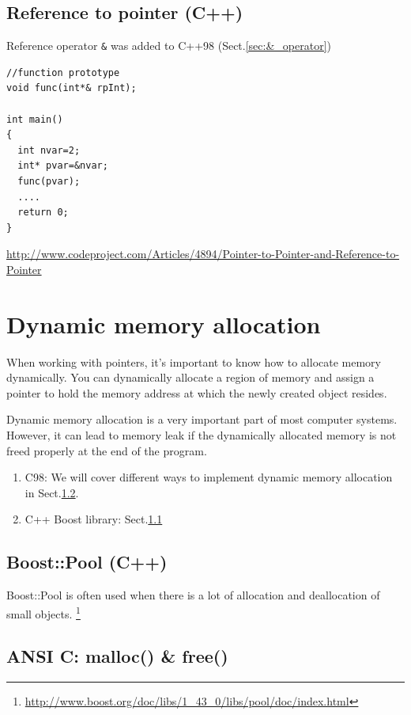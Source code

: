 \subsection{Reference to pointer (C++)}
\label{sec:reference-to-pointer}

Reference operator \verb!&! was added to C++98  (Sect.\ref{sec:&_operator})

\begin{verbatim}
//function prototype
void func(int*& rpInt);

int main()
{
  int nvar=2;
  int* pvar=&nvar;
  func(pvar);
  ....
  return 0;
}
\end{verbatim}

\url{http://www.codeproject.com/Articles/4894/Pointer-to-Pointer-and-Reference-to-Pointer}

\section{Dynamic memory allocation}
\label{sec:dynam-memory-alloc-1}

When working with pointers, it's important to know how to allocate memory
dynamically. You can dynamically allocate a region of memory and assign a
pointer to hold the memory address at which the newly created object resides.

Dynamic memory allocation is a very important part of most computer systems.
However, it can lead to memory leak if the dynamically allocated
memory is not freed properly at the end of the program.

\begin{enumerate}
  \item C98:  We will cover different ways to implement dynamic memory
  allocation in Sect.\ref{sec:understand_malloc}.

  \item C++ Boost library: Sect.\ref{sec:Boost::Pool}
\end{enumerate}

\subsection{Boost::Pool (C++)}
\label{sec:Boost::Pool}

Boost::Pool is often used when there is a lot of allocation and deallocation of
small objects.
\footnote{\url{http://www.boost.org/doc/libs/1_43_0/libs/pool/doc/index.html}}



\subsection{ANSI C: malloc() \& free()}
\label{sec:understand_malloc}

